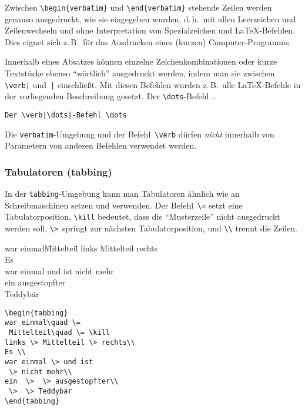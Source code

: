 Zwischen \verb|\begin{verbatim}| und \verb|\end{verbatim}|
stehende Zeilen werden genauso ausgedruckt, wie sie eingegeben
wurden, d.\,h.\ mit allen Leerzeichen und Zeilenwechseln und ohne
Interpretation von Spezialzeichen und \LaTeX-Befehlen.  Dies
eignet sich z.\,B.\ für das Ausdrucken eines (kurzen)
Computer-Programms.

Innerhalb eines Absatzes können einzelne Zeichenkombinationen
oder kurze Textstücke ebenso "`wörtlich"' ausgedruckt
werden, indem man sie zwischen \verb.\verb|. und~\verb.|.
einschließt.
Mit diesen Befehlen wurden z.\,B.\ alle \LaTeX-Befehle in der
vorliegenden Beschreibung gesetzt.
\exa
Der \verb|\dots|-Befehl \dots
\exb
\begin{verbatim}
Der \verb|\dots|-Befehl \dots
\end{verbatim}
\exc
 
Die \texttt{verbatim}-Umgebung und der Befehl~\verb|\verb|
dürfen \emph{nicht} innerhalb von Parametern von anderen Befehlen
verwendet werden.


 
\subsubsection{Tabulatoren (tabbing)} \label{tabbing}
 
In der \texttt{tabbing}-Umgebung kann man Tabulatoren ähnlich wie
an Schreibmaschinen setzen und verwenden.
Der Befehl~\verb|\=| setzt eine Tabulatorposition,
\verb|\kill| bedeutet, dass die "`Musterzeile"' nicht ausgedruckt werden
soll,
\verb|\>|~springt zur nächsten Tabulatorposition,
und \verb|\\| trennt die Zeilen.
%
\par\vspace{0pt plus5\baselineskip}
\pagebreak[3]\vspace{0pt plus-5\baselineskip}
%
\exa
\begin{tabbing}
war einmal\quad \=
 Mittelteil\quad \= \kill
links \> Mittelteil \> rechts\\
Es \\
war einmal \> und ist
 \> nicht mehr\\
ein  \>  \> ausgestopfter\\
 \>  \> Teddybär
\end{tabbing}
\exb
\begin{verbatim}
\begin{tabbing}
war einmal\quad \=
 Mittelteil\quad \= \kill
links \> Mittelteil \> rechts\\
Es \\
war einmal \> und ist
 \> nicht mehr\\
ein  \>  \> ausgestopfter\\
 \>  \> Teddybär
\end{tabbing}
\end{verbatim}
\exc


